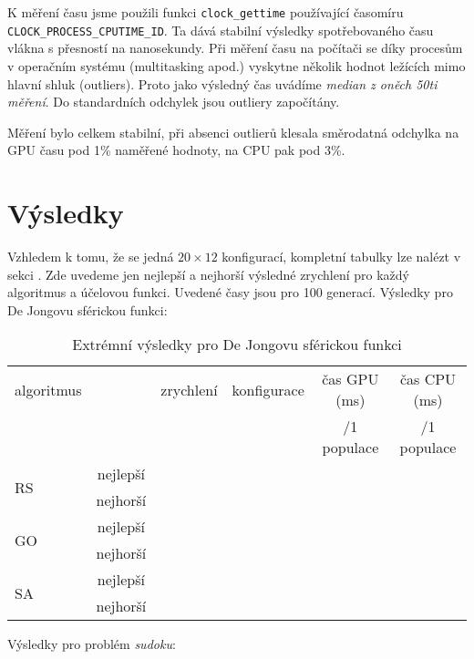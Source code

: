 K měření času jsme použili funkci \texttt{clock\_gettime} používající časomíru \texttt{CLOCK\_PROCESS\_CPUTIME\_ID}. Ta dává stabilní výsledky spotřebovaného času vlákna s přesností na nanosekundy. Při měření času na počítači se díky procesům v operačním systému (multitasking apod.) vyskytne několik hodnot ležících mimo hlavní shluk (outliers). Proto jako výsledný čas uvádíme \emph{median z oněch 50ti měření}. Do standardních odchylek jsou outliery započítány.

Měření bylo celkem stabilní, při absenci outlierů klesala směrodatná odchylka na GPU času pod 1\% naměřené hodnoty, na CPU pak pod 3\%.

\section{Výsledky}

Vzhledem k tomu, že se jedná $20\times 12$ konfigurací, kompletní tabulky lze nalézt v sekci . Zde uvedeme jen nejlepší a nejhorší výsledné zrychlení pro každý algoritmus a účelovou funkci. Uvedené časy jsou pro 100 generací. Výsledky pro De Jongovu sférickou funkci:

\begin{table}[h]
    \begin{center}
    \begin{tabular}{lccccc}
      \toprule
      algoritmus &  & zrychlení & konfigurace & čas GPU (ms) & čas CPU (ms) \\
      & & & & /1 populace & /1 populace \\
      \midrule
      \multirow{2}{*}{RS} & nejlepší & & & & \\
                        & nejhorší & & & & \\
      \multirow{2}{*}{GO} & nejlepší & & & & \\
                        & nejhorší & & & & \\
      \multirow{2}{*}{SA} & nejlepší & & & & \\
                        & nejhorší & & & & \\
      \bottomrule
    \end{tabular}
    \caption{Extrémní výsledky pro De Jongovu sférickou funkci}
    \end{center}
\end{table}

Výsledky pro problém \emph{sudoku}:

